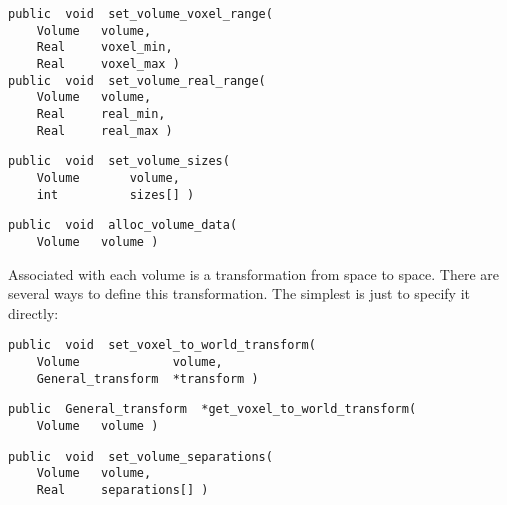 {\bf\begin{verbatim}
public  void  set_volume_voxel_range(
    Volume   volume,
    Real     voxel_min,
    Real     voxel_max )
public  void  set_volume_real_range(
    Volume   volume,
    Real     real_min,
    Real     real_max )
\end{verbatim}}


{\bf\begin{verbatim}
public  void  set_volume_sizes(
    Volume       volume,
    int          sizes[] )
\end{verbatim}}


{\bf\begin{verbatim}
public  void  alloc_volume_data(
    Volume   volume )
\end{verbatim}}


Associated with each volume is a transformation from 
space to  space.  There are several ways to define this
transformation.  The simplest is just to specify it directly:

{\bf\begin{verbatim}
public  void  set_voxel_to_world_transform(
    Volume             volume,
    General_transform  *transform )
\end{verbatim}}


{\bf\begin{verbatim}
public  General_transform  *get_voxel_to_world_transform(
    Volume   volume )
\end{verbatim}}


{\bf\begin{verbatim}
public  void  set_volume_separations(
    Volume   volume,
    Real     separations[] )
\end{verbatim}}

